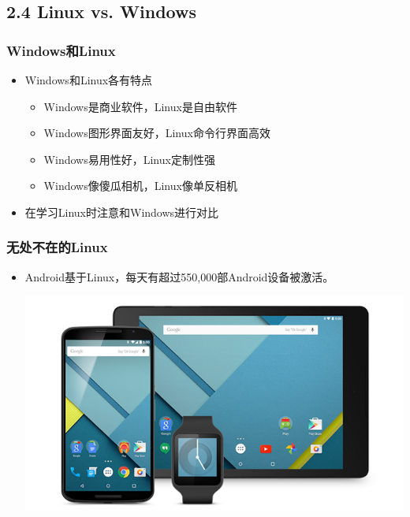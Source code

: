 \documentclass[xcolor=svgnames,bigger,presentation]{beamer}
\begin{document}
\subsection{2.4 Linux vs. Windows}
\label{sec-2-4}
\begin{frame}
\frametitle{Windows和Linux}
\label{sec-2-4-1}
\begin{itemize}

\item Windows和Linux各有特点
\label{sec-2-4-1-1}%
\begin{itemize}

\item Windows是商业软件，Linux是自由软件
\label{sec-2-4-1-1-1}%

\item Windows图形界面友好，Linux命令行界面高效
\label{sec-2-4-1-1-2}%

\item Windows易用性好，Linux定制性强
\label{sec-2-4-1-1-3}%

\item Windows像傻瓜相机，Linux像单反相机
\label{sec-2-4-1-1-4}%
\end{itemize} %

\item 在学习Linux时注意和Windows进行对比
\label{sec-2-4-1-2}%
\end{itemize} %
\end{frame}
\begin{frame}
\frametitle{无处不在的Linux}
\label{sec-2-4-2}
\begin{itemize}

\item Android基于Linux，每天有超过550,000部Android设备被激活。
\label{sec-2-4-2-1}%
\begin{center}
\includegraphics[width=.9\linewidth]{img/android.jpg}
\end{center}

\end{itemize} %
\end{frame}
\end{document}

